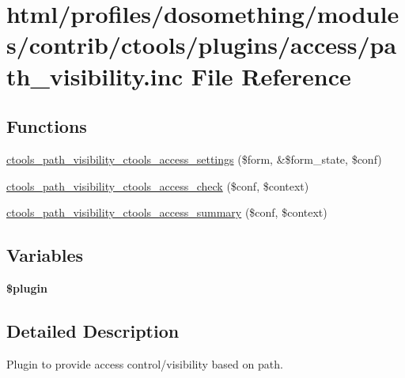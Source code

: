\hypertarget{path__visibility_8inc}{
\section{html/profiles/dosomething/modules/contrib/ctools/plugins/access/path\_\-visibility.inc File Reference}
\label{path__visibility_8inc}
}
\subsection*{Functions}
\begin{DoxyCompactItemize}
\item 
\hyperlink{path__visibility_8inc_a6f4294c309bedd34c01a2a94441c23dd}{ctools\_\-path\_\-visibility\_\-ctools\_\-access\_\-settings} (\$form, \&\$form\_\-state, \$conf)
\item 
\hyperlink{path__visibility_8inc_ac2d365fb2246a343312ce6590e9d147f}{ctools\_\-path\_\-visibility\_\-ctools\_\-access\_\-check} (\$conf, \$context)
\item 
\hyperlink{path__visibility_8inc_acf915389dcc61088cc1c60d4b9184254}{ctools\_\-path\_\-visibility\_\-ctools\_\-access\_\-summary} (\$conf, \$context)
\end{DoxyCompactItemize}
\subsection*{Variables}
\begin{DoxyCompactItemize}
\item 
{\bfseries \$plugin}
\end{DoxyCompactItemize}


\subsection{Detailed Description}
Plugin to provide access control/visibility based on path. 

